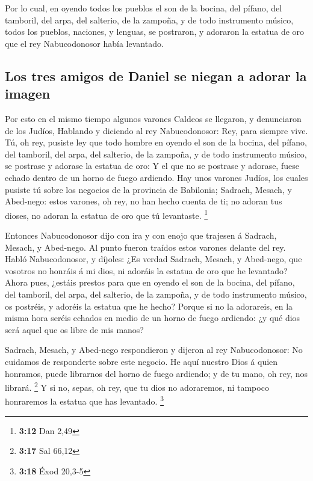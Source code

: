  Por lo cual, en oyendo todos los pueblos el son de la
bocina, del pífano, del tamboril, del arpa, del salterio, de la zampoña,
y de todo instrumento músico, todos los pueblos, naciones, y lenguas, se
postraron, y adoraron la estatua de oro que el rey Nabucodonosor había
levantado.

\hypertarget{los-tres-amigos-de-daniel-se-niegan-a-adorar-la-imagen}{%
\subsection{Los tres amigos de Daniel se niegan a adorar la
imagen}\label{los-tres-amigos-de-daniel-se-niegan-a-adorar-la-imagen}}

 Por esto en el mismo tiempo algunos varones Caldeos se
llegaron, y denunciaron de los Judíos,  Hablando y diciendo
al rey Nabucodonosor: Rey, para siempre vive.  Tú, oh rey,
pusiste ley que todo hombre en oyendo el son de la bocina, del pífano,
del tamboril, del arpa, del salterio, de la zampoña, y de todo
instrumento músico, se postrase y adorase la estatua de oro:
 Y el que no se postrase y adorase, fuese echado dentro de
un horno de fuego ardiendo.  Hay unos varones Judíos, los
cuales pusiste tú sobre los negocios de la provincia de Babilonia;
Sadrach, Mesach, y Abed-nego: estos varones, oh rey, no han hecho cuenta
de ti; no adoran tus dioses, no adoran la estatua de oro que tú
levantaste. \footnote{\textbf{3:12} Dan 2,49}

 Entonces Nabucodonosor dijo con ira y con enojo que
trajesen á Sadrach, Mesach, y Abed-nego. Al punto fueron traídos estos
varones delante del rey.  Habló Nabucodonosor, y díjoles:
¿Es verdad Sadrach, Mesach, y Abed-nego, que vosotros no honráis á mi
dios, ni adoráis la estatua de oro que he levantado?  Ahora
pues, ¿estáis prestos para que en oyendo el son de la bocina, del
pífano, del tamboril, del arpa, del salterio, de la zampoña, y de todo
instrumento músico, os postréis, y adoréis la estatua que he hecho?
Porque si no la adorareis, en la misma hora seréis echados en medio de
un horno de fuego ardiendo: ¿y qué dios será aquel que os libre de mis
manos?

 Sadrach, Mesach, y Abed-nego respondieron y dijeron al rey
Nabucodonosor: No cuidamos de responderte sobre este negocio.
 He aquí nuestro Dios á quien honramos, puede librarnos del
horno de fuego ardiendo; y de tu mano, oh rey, nos librará. \footnote{\textbf{3:17}
  Sal 66,12}  Y si no, sepas, oh rey, que tu dios no
adoraremos, ni tampoco honraremos la estatua que has levantado.
\footnote{\textbf{3:18} Éxod 20,3-5}

